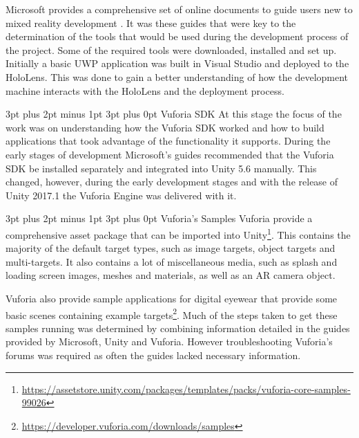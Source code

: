 \documentclass[12pt,a4paper,oneside]{article}
\makeatletter
\renewcommand\paragraph{\@startsection {paragraph}{1}{0mm} %
	                           {3pt plus 2pt minus 1pt} %
	                           {3pt plus 0pt} %
	                           {\normalfont}}
\renewcommand\subsubsection{\@startsection {subsubsection}{1}{0mm} %
	                           {3pt plus 2pt minus 1pt} %
	                           {3pt plus 0pt} %
	                           {\normalfont\bfseries}}
\makeatother
\begin{document}
Microsoft provides a comprehensive set of online documents to guide users new to mixed reality development \cite{hololensdev}. It was these guides that were key to the determination of the tools that would be used during the development process of the project. Some of the required tools were downloaded, installed and set up. Initially a basic UWP application was built in Visual Studio and deployed to the HoloLens. This was done to gain a better understanding of how the development machine interacts with the HoloLens and the deployment process.

\subsubsection{Vuforia SDK}
At this stage the focus of the work was on understanding how the Vuforia SDK worked and how to build applications that took advantage of the functionality it supports. During the early stages of development Microsoft's guides recommended that the Vuforia SDK be installed separately and integrated into Unity 5.6 manually. This changed, however, during the early development stages and with the release of Unity 2017.1 the Vuforia Engine was delivered with it.

\paragraph{Vuforia's Samples}
Vuforia provide a comprehensive asset package that can be imported into Unity\footnote{\url{https://assetstore.unity.com/packages/templates/packs/vuforia-core-samples-99026}}. This contains the majority of the default target types, such as image targets, object targets and multi-targets. It also contains a lot of miscellaneous media, such as splash and loading screen images, meshes and materials,  as well as an AR camera object.

Vuforia also provide sample applications for digital eyewear that provide some basic scenes containing example targets\footnote{\url{https://developer.vuforia.com/downloads/samples}}. Much of the steps taken to get these samples running was determined by combining information detailed in the guides provided by Microsoft, Unity and Vuforia. However troubleshooting Vuforia's forums was required as often the guides lacked necessary information. 
\end{document}
